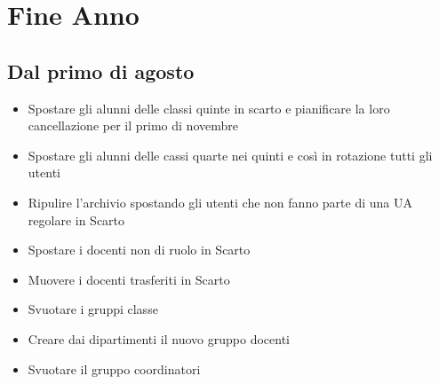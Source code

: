 \chapter{Fine Anno}
\section{Dal primo di agosto}
\begin{itemize}
	\item Spostare gli alunni delle classi quinte in scarto e pianificare la loro cancellazione per il primo di novembre
	\item Spostare gli alunni delle cassi quarte nei quinti e così in rotazione tutti gli utenti
	\item Ripulire l'archivio spostando gli utenti che non fanno parte di una UA regolare in Scarto
	\item Spostare i docenti non di ruolo in Scarto
	\item Muovere i docenti trasferiti in Scarto
	\item Svuotare i gruppi classe
	\item Creare dai dipartimenti il nuovo gruppo docenti
	\item Svuotare il gruppo coordinatori
\end{itemize}